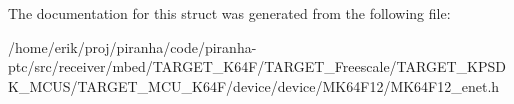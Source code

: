 The documentation for this struct was generated from the following file\+:\begin{DoxyCompactItemize}
\item 
/home/erik/proj/piranha/code/piranha-\/ptc/src/receiver/mbed/\+T\+A\+R\+G\+E\+T\+\_\+\+K64\+F/\+T\+A\+R\+G\+E\+T\+\_\+\+Freescale/\+T\+A\+R\+G\+E\+T\+\_\+\+K\+P\+S\+D\+K\+\_\+\+M\+C\+U\+S/\+T\+A\+R\+G\+E\+T\+\_\+\+M\+C\+U\+\_\+\+K64\+F/device/device/\+M\+K64\+F12/M\+K64\+F12\+\_\+enet.\+h\end{DoxyCompactItemize}
